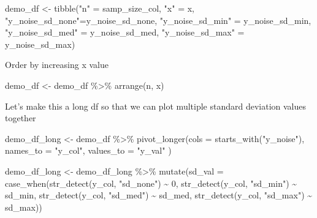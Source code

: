 \documentclass[
]{book}
\newenvironment{Shaded}{\begin{snugshade}}{\end{snugshade}}
\newcommand{\AttributeTok}[1]{\textcolor[rgb]{0.77,0.63,0.00}{#1}}
\newcommand{\DecValTok}[1]{\textcolor[rgb]{0.00,0.00,0.81}{#1}}
\newcommand{\FunctionTok}[1]{\textcolor[rgb]{0.00,0.00,0.00}{#1}}
\newcommand{\NormalTok}[1]{#1}
\newcommand{\OtherTok}[1]{\textcolor[rgb]{0.56,0.35,0.01}{#1}}
\newcommand{\SpecialCharTok}[1]{\textcolor[rgb]{0.00,0.00,0.00}{#1}}
\newcommand{\StringTok}[1]{\textcolor[rgb]{0.31,0.60,0.02}{#1}}
\begin{document}
\begin{Shaded}
\begin{Highlighting}[]
\NormalTok{demo\_df }\OtherTok{\textless{}{-}} \FunctionTok{tibble}\NormalTok{(}\StringTok{"n"} \OtherTok{=}\NormalTok{ samp\_size\_col,}
                  \StringTok{"x"} \OtherTok{=}\NormalTok{ x, }
                  \StringTok{"y\_noise\_sd\_none"}\OtherTok{=}\NormalTok{y\_noise\_sd\_none, }
                  \StringTok{"y\_noise\_sd\_min"} \OtherTok{=}\NormalTok{ y\_noise\_sd\_min,}
                  \StringTok{"y\_noise\_sd\_med"} \OtherTok{=}\NormalTok{ y\_noise\_sd\_med,}
                  \StringTok{"y\_noise\_sd\_max"} \OtherTok{=}\NormalTok{ y\_noise\_sd\_max)}
\end{Highlighting}
\end{Shaded}

Order by increasing x value

\begin{Shaded}
\begin{Highlighting}[]
\NormalTok{demo\_df }\OtherTok{\textless{}{-}}\NormalTok{ demo\_df }\SpecialCharTok{\%\textgreater{}\%} 
  \FunctionTok{arrange}\NormalTok{(n, x)}
\end{Highlighting}
\end{Shaded}

Let's make this a long df so that we can plot multiple standard deviation values together

\begin{Shaded}
\begin{Highlighting}[]
\NormalTok{demo\_df\_long }\OtherTok{\textless{}{-}}\NormalTok{ demo\_df }\SpecialCharTok{\%\textgreater{}\%} 
  \FunctionTok{pivot\_longer}\NormalTok{(}\AttributeTok{cols =} \FunctionTok{starts\_with}\NormalTok{(}\StringTok{"y\_noise"}\NormalTok{),}
               \AttributeTok{names\_to =} \StringTok{"y\_col"}\NormalTok{,}
               \AttributeTok{values\_to =} \StringTok{"y\_val"}
\NormalTok{  )}

\NormalTok{demo\_df\_long }\OtherTok{\textless{}{-}}\NormalTok{ demo\_df\_long }\SpecialCharTok{\%\textgreater{}\%} 
  \FunctionTok{mutate}\NormalTok{(}\AttributeTok{sd\_val =} \FunctionTok{case\_when}\NormalTok{(}\FunctionTok{str\_detect}\NormalTok{(y\_col, }\StringTok{"sd\_none"}\NormalTok{) }\SpecialCharTok{\textasciitilde{}} \DecValTok{0}\NormalTok{,}
                            \FunctionTok{str\_detect}\NormalTok{(y\_col, }\StringTok{"sd\_min"}\NormalTok{) }\SpecialCharTok{\textasciitilde{}}\NormalTok{ sd\_min,}
                            \FunctionTok{str\_detect}\NormalTok{(y\_col, }\StringTok{"sd\_med"}\NormalTok{) }\SpecialCharTok{\textasciitilde{}}\NormalTok{ sd\_med,}
                            \FunctionTok{str\_detect}\NormalTok{(y\_col, }\StringTok{"sd\_max"}\NormalTok{) }\SpecialCharTok{\textasciitilde{}}\NormalTok{ sd\_max))}
\end{Highlighting}
\end{Shaded}
\end{document}
